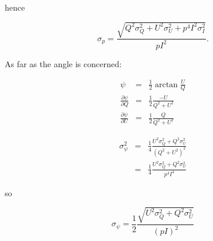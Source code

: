 \documentclass[12pt]{article}
\begin{document}
hence

\begin{equation}
\sigma_p = \frac{\sqrt{Q^2\sigma_Q^2+U^2\sigma_U^2+p^4I^2\sigma_I^2}}{pI^2}.
\end{equation}

As far as the angle is concerned:

\begin{eqnarray}
\psi & = & \frac{1}{2}\arctan{\frac{U}{Q}}\\
\frac{\partial \psi}{\partial Q} &=& \frac{1}{2}\frac{-U}{Q^2+U^2} \\
\frac{\partial \psi}{\partial U} &=& \frac{1}{2}\frac{Q}{Q^2+U^2}
\end{eqnarray}

\begin{eqnarray}
\sigma_\psi^2 &=& \frac{1}{4}\frac{U^2\sigma_Q^2+Q^2\sigma_U^2}{(Q^2+U^2)^2}\\
&=&\frac{1}{4}\frac{U^2\sigma_Q^2+Q^2\sigma_U^2}{p^4I^4}
\end{eqnarray}

so

\begin{equation}
\sigma_\psi = \frac{1}{2}\frac{\sqrt{U^2\sigma_Q^2+Q^2\sigma_U^2}}{(pI)^2}
\end{equation}
\end{document}

